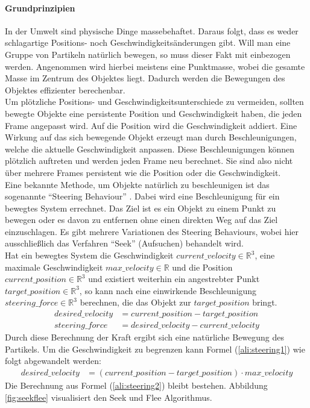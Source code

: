 \documentclass[11pt,a4paper]{article}
\begin{document}
\paragraph{Grundprinzipien}
\label{sec:GrundprinzipienBewegung}
In der Umwelt sind physische Dinge massebehaftet. Daraus folgt, dass es weder schlagartige Positions- noch Geschwindigkeitsänderungen gibt. Will man eine Gruppe von Partikeln natürlich bewegen, so muss dieser Fakt mit einbezogen werden. Angenommen wird hierbei meistens eine Punktmasse, wobei die gesamte Masse im Zentrum des Objektes liegt. Dadurch werden die Bewegungen des Objektes effizienter berechenbar.\\
Um plötzliche Positions- und Geschwindigkeitsunterschiede zu vermeiden, sollten bewegte Objekte eine persistente Position und Geschwindigkeit haben, die jeden Frame angepasst wird. Auf die Position wird die Geschwindigkeit addiert. Eine Wirkung auf das sich bewegende Objekt erzeugt man durch Beschleunigungen, welche die aktuelle Geschwindigkeit anpassen. Diese Beschleunigungen können plötzlich auftreten und werden jeden Frame neu berechnet. Sie sind also nicht über mehrere Frames persistent wie die Position oder die Geschwindigkeit.\\
Eine bekannte Methode, um Objekte natürlich zu beschleunigen ist das sogenannte ``Steering Behaviour'' \cite{580abc6c6615ef9f9c16f9069351938a0dda3c5120b7e8d1450d6b1abf0a71df}. Dabei wird eine Beschleunigung für ein bewegtes System errechnet. Das Ziel ist es ein Objekt zu einem Punkt zu bewegen oder es davon zu entfernen ohne einen direkten Weg auf das Ziel einzuschlagen. Es gibt mehrere Variationen des Steering Behaviours, wobei hier ausschließlich das Verfahren ``Seek'' (Aufsuchen) behandelt wird.\\
Hat ein bewegtes System die Geschwindigkeit $current\_velocity \in \mathbb{R}^3$, eine maximale Geschwindigkeit $max\_velocity \in \mathbb{R}$ und die Position $current\_position \in \mathbb{R}^3$ und existiert weiterhin ein angestrebter Punkt $target\_position \in \mathbb{R}^3$, so kann nach \cite[S. 2]{580abc6c6615ef9f9c16f9069351938a0dda3c5120b7e8d1450d6b1abf0a71df} eine einwirkende Beschleunigung $steering\_force \in \mathbb{R}^3$ berechnen, die das Objekt zur $target\_position$ bringt.
\begin{align}
desired\_velocity &= current\_position - target\_position \label{ali:steering1} \\
steering\_force &= desired\_velocity - current\_velocity \label{ali:steering2}
\end{align}
Durch diese Berechnung der Kraft ergibt sich eine natürliche Bewegung des Partikels.
Um die Geschwindigkeit zu begrenzen kann Formel (\ref{ali:steering1}) wie folgt abgewandelt werden:
\begin{align}
desired\_velocity &= (current\_position - target\_position) \cdot max\_velocity
\end{align}
\noindent
Die Berechnung aus Formel (\ref{ali:steering2}) bleibt bestehen. Abbildung \ref{fig:seekflee} visualisiert den Seek und Flee Algorithmus.
\end{document}
